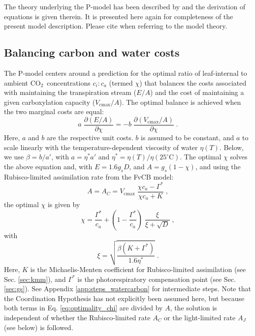 \documentclass{myreport}
\newcommand{\coo}{CO$_2$}
\begin{document}
The theory underlying the P-model has been described by \cite{wang17natpl} and the derivation of equations is given therein. It is presented here again for completeness of the present model description. Please cite \cite{wang17natpl} when referring to the model theory. 

\subsection{Balancing carbon and water costs}
\label{sec:watercarbon}
The P-model centers around a prediction for the optimal ratio of leaf-internal to ambient \coo\ concentrations $c_i:c_a$ (termed $\chi$) that balances the costs associated with maintaining the transpiration stream ($E/A$) and the cost of maintaining a given carboxylation capacity ($V_{\mathrm{cmax}}/A$). The optimal balance is achieved when the two marginal costs are equal: 
\begin{equation}
\label{eq:optimality_chi}
a \; \frac{\partial (E/A)}{\partial \chi} = -b \; \frac{\partial (V_{\mathrm{cmax}}/A)}{\partial \chi}\;.
\end{equation}
Here, $a$ and $b$ are the respective unit costs. $b$ is assumed to be constant, and $a$ to scale linearly with the temperature-dependent viscosity of water $\eta(T)$. Below, we use $\beta = b / a'$, with $a = \eta^\ast a'$ and $\eta^\ast = \eta(T) / \eta(25^{\circ}\text{C})$. The optimal $\chi$ solves the above equation and, with $E = 1.6 g_s D$, and $A = g_s (1-\chi)$, and using the Rubisco-limited assimilation rate from the FvCB model:
\begin{equation}
\label{eq:ac}
A = A_C = V_{\mathrm{cmax}} \; \frac{\chi c_a-\Gamma^{\ast}}{\chi c_a + K}\; ,
\end{equation}
the optimal $\chi$ is given by
\begin{equation}
\label{eq:chiopt}
\chi = \frac{\Gamma^{\ast}}{c_a} + \left(1- \frac{\Gamma^{\ast}}{c_a}\right)\;\frac{\xi}{\xi + \sqrt{D}}\;,
\end{equation}
with 
\begin{equation}
\label{eq:xi}
\xi = \sqrt{\frac{\beta (K+\Gamma^{\ast})}{1.6 \eta^{\ast}}}\;.
\end{equation}
Here, $K$ is the Michaelis-Menten coefficient for Rubisco-limited assimilation (see Sec. \ref{sec:kmm}), and $\Gamma^{\ast}$ is the photorespiratory compensation point (see Sec. \ref{sec:gs}). See Appendix \ref{app:steps_watercarbon} for intermediate steps. Note that the Coordination Hypothesis has not explicitly been assumed here, but because both terms in Eq. \ref{eq:optimality_chi} are divided by $A$, the solution is independent of whether the Rubisco-limited rate $A_C$ or the light-limited rate $A_J$ (see below) is followed.
\end{document}
